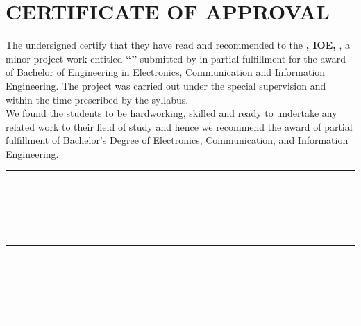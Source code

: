 \chapter*{CERTIFICATE OF APPROVAL}

\noindent The undersigned certify that they have read and recommended to the
\textbf{\cDept, IOE, \cCampus}, a minor project work entitled \textbf{``\cTitle''} submitted by
\textbf{\authorList} in partial fulfillment for the award of Bachelor of
Engineering in Electronics, Communication and Information Engineering.
The project was carried out under the special supervision and within the time
prescribed by the syllabus.\\[10pt]
We found the students to be hardworking, skilled and ready to undertake
any related work to their field of study and hence we recommend the award of
partial fulfillment of Bachelor's Degree of Electronics, Communication, and
Information Engineering.

\vspace{2em}

\noindent
\begin{minipage}[t]{0.48\textwidth}
    \rule{6cm}{0.2mm} \\
    \cSupervisorTitle \\
    \cSupervisor \\
    \cSupervisorDept \\
    \cSupervisorAddress
\end{minipage}
\hfill
\begin{minipage}[t]{0.48\textwidth}
    \rule{6cm}{0.2mm} \\
    \cExternalExaminerTitle \\
    \cExternalExaminer \\
    \cExternalExaminerDept \\
    \cExternalExaminerAddress
\end{minipage}

\vspace{3em}

\noindent
\begin{minipage}[t]{0.48\textwidth}
    \rule{6cm}{0.2mm} \\
    \cHODTitle \\
    \cHOD \\
    \cHODDept \\
    \cHODAddress
\end{minipage}

\vspace{2em}

\noindent\cDate
